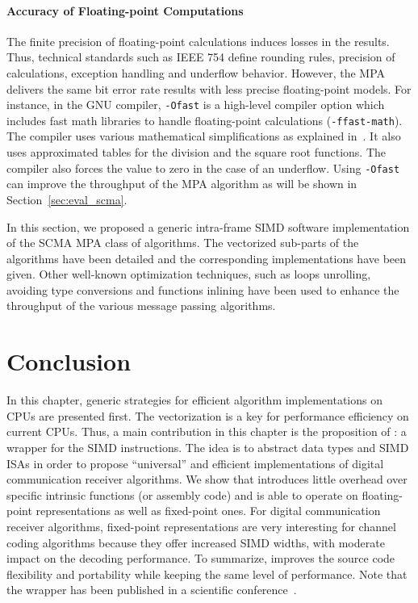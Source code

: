 \paragraph{Accuracy of Floating-point Computations}
\label{sec:opt_scma_float}

The finite precision of floating-point calculations induces losses in the
results. Thus, technical standards such as IEEE 754 define rounding rules,
precision of calculations, exception handling and underflow behavior. However,
the MPA delivers the same bit error rate results with less precise
floating-point models. For instance, in the GNU compiler, \verb|-Ofast| is a
high-level compiler option which includes fast math libraries to handle
floating-point calculations (\verb|-ffast-math|). The compiler uses various
mathematical simplifications as explained in~\cite{Gccfp2018}. It also uses
approximated tables for the division and the square root functions. The compiler
also forces the value to zero in the case of an underflow. Using \verb|-Ofast|
can improve the throughput of the MPA algorithm as will be shown in
Section~\ref{sec:eval_scma}.

In this section, we proposed a generic intra-frame SIMD software implementation
of the SCMA MPA class of algorithms. The vectorized sub-parts of the algorithms
have been detailed and the corresponding \MIPP implementations have been given.
Other well-known optimization techniques, such as loops unrolling, avoiding type
conversions and functions inlining have been used to enhance the throughput of
the various message passing algorithms.

\newpage
\section{Conclusion}

In this chapter, generic strategies for efficient algorithm implementations on
CPUs are presented first. The vectorization is a key for performance efficiency
on current CPUs. Thus, a main contribution in this chapter is the proposition of
\MIPP: a wrapper for the SIMD instructions. The idea is to abstract data types
and SIMD ISAs in order to propose ``universal'' and efficient implementations of
digital communication receiver algorithms. We show that \MIPP introduces little
overhead over specific intrinsic functions (or assembly code) and is able to
operate on floating-point representations as well as fixed-point ones. For
digital communication receiver algorithms, fixed-point representations are very
interesting for channel coding algorithms because they offer increased SIMD
widths, with moderate impact on the decoding performance. To summarize, \MIPP
improves the source code flexibility and portability while keeping the same
level of performance. Note that the \MIPP wrapper has been published in a
scientific conference~\cite{Cassagne2018}.

